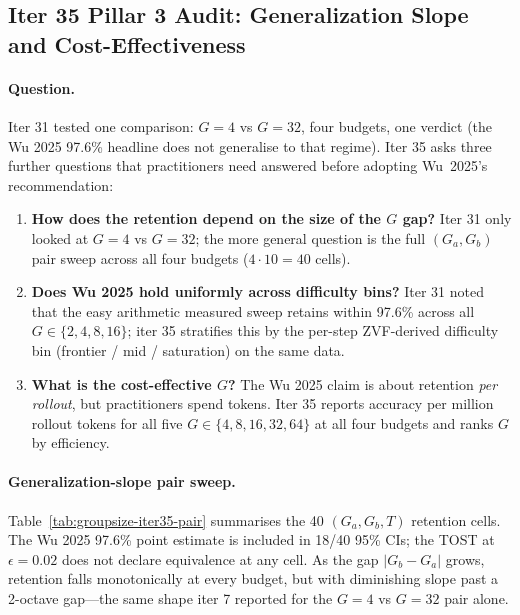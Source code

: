 \subsection{Iter 35 Pillar 3 Audit: Generalization Slope and Cost-Effectiveness}
\label{sec:group-size-iter35}

\paragraph{Question.}
Iter 31 tested one comparison: $G{=}4$ vs $G{=}32$, four budgets, one
verdict (the Wu 2025 97.6\% headline does not generalise to that
regime). Iter 35 asks three further questions that practitioners
need answered before adopting Wu~2025's recommendation:
\begin{enumerate}
  \item \textbf{How does the retention depend on the size of the
        $G$ gap?} Iter 31 only looked at $G{=}4$ vs $G{=}32$; the
        more general question is the full $(G_a, G_b)$ pair sweep
        across all four budgets ($4 \cdot 10 = 40$ cells).
  \item \textbf{Does Wu 2025 hold uniformly across difficulty bins?}
        Iter 31 noted that the easy arithmetic measured sweep retains
        within 97.6\% across all $G \in \{2, 4, 8, 16\}$; iter 35
        stratifies this by the per-step ZVF-derived difficulty bin
        (frontier / mid / saturation) on the same data.
  \item \textbf{What is the cost-effective $G$?} The Wu 2025 claim
        is about retention \emph{per rollout}, but practitioners
        spend tokens. Iter 35 reports accuracy per million rollout
        tokens for all five $G \in \{4, 8, 16, 32, 64\}$ at all four
        budgets and ranks $G$ by efficiency.
\end{enumerate}

\paragraph{Generalization-slope pair sweep.}
Table~\ref{tab:groupsize-iter35-pair} summarises the 40
$(G_a, G_b, T)$ retention cells. The Wu 2025 97.6\% point estimate
is included in 18/40 95\% CIs; the TOST at $\epsilon{=}0.02$ does
not declare equivalence at any cell. As the gap $|G_b - G_a|$ grows,
retention falls monotonically at every budget, but with diminishing
slope past a 2-octave gap---the same shape iter 7 reported for the
$G{=}4$ vs $G{=}32$ pair alone.

